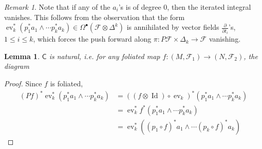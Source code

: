 \documentclass[12pt]{amsart}
\makeatletter
\newtheorem{lem}[thm]{Lemma}
\theoremstyle{definition}
\theoremstyle{remark}
\newtheorem{rem}[thm]{Remark}
\numberwithin{equation}{section}
\newcommand{\del}{\partial}
\renewcommand{\del}{\partial}
\newcommand{\CF}{{\mathcal F}}
\newcommand{\1}{{\mathbb{1}}}
\newcommand{\bt}{\bullet}
\newcommand{\id}{\operatorname{Id}}
\newcommand{\ev}{\operatorname{ev}}
\newcommand{\extp}{\@ifnextchar^\@extp{\@extp^{\,}}}
\def\@extp^#1{\mathop{\bigwedge\nolimits^{\!#1}}}
\makeatother
\begin{document}
	\begin{rem}
	    Note that if any of the $a_i$'s is of degree 0, then the iterated integral vanishes. This follows from the observation that the form $\ev_k^*(p_1^* a_1\wedge \cdots p_k^* a_k) \in \Omega^{\bt}(\CF \otimes \Delta^k)$ is annihilated by vector fields $\frac{\del}{\del t_i}$'s, $1 \le i \le k$, which forces the push forward along $\pi: P\CF \times \Delta_k \to \CF$ vanishing.
	\end{rem}
	
	\begin{lem}
	    $\mathsf{C}$ is natural, i.e. for any foliated map $f:(M, \CF_1) \to (N, \CF_2)$, the diagram
	    \begin{center}
        \end{center}
	\end{lem}
	\begin{proof}
	Since $f$ is foliated,
	\begin{align*}
	(Pf)^* \ev_k^*(p_1^* a_1\wedge \cdots p_k^* a_k)
	     &= ((f\otimes \id)\circ \ev_k)^*(p_1^* a_1\wedge \cdots p_k^* a_k)\\
	     &=\ev_k^* f^*(p_1^* a_1\wedge \cdots p_k^* a_k)\\
	    &= \ev_k^* ((p_1\circ f)^* a_1\wedge \cdots (p_k\circ f)^* a_k)
	\end{align*}
	\end{proof}
\end{document}
